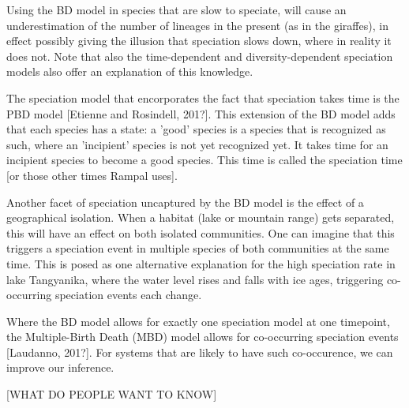 %
%
%

Using the BD model in species that are slow to speciate, will cause
an underestimation of the number of lineages in the present (as in the
giraffes), in effect possibly giving the illusion that speciation 
slows down, where in reality it does not. Note that also the
time-dependent and diversity-dependent speciation models also
offer an explanation of this knowledge.

%
%
%
%
%

The speciation model that encorporates the fact that speciation takes
time is the PBD model [Etienne and Rosindell, 201?]. This extension of the
BD model adds that each species has a state: a 'good' species is
a species that is recognized as such, where an 'incipient' species is
not yet recognized yet. It takes time for an incipient species to
become a good species. This time is called the speciation time [or those
other times Rampal uses].

%
%
%

Another facet of speciation uncaptured by the BD model is the
effect of a geographical isolation. When a habitat (lake or mountain range)
gets separated, this will have an effect on both isolated communities.
One can imagine that this triggers a speciation event in multiple species
of both communities at the same time. This is posed as one alternative
explanation for the high speciation rate in lake Tangyanika, where the water 
level rises and falls with ice ages, triggering co-occurring speciation
events each change. 

%
%
%

Where the BD model allows for exactly one speciation model at one timepoint,
the Multiple-Birth Death (MBD) model allows for co-occurring 
speciation events [Laudanno, 201?]. For systems that are likely
to have such co-occurence, we can improve our inference.







[WHAT DO PEOPLE WANT TO KNOW]